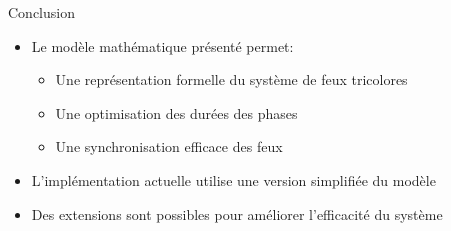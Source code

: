 \documentclass{beamer}
\begin{document}
\begin{frame}{Conclusion}
\begin{itemize}
    \item Le modèle mathématique présenté permet:
    \begin{itemize}
        \item Une représentation formelle du système de feux tricolores
        \item Une optimisation des durées des phases
        \item Une synchronisation efficace des feux
    \end{itemize}
    \item L'implémentation actuelle utilise une version simplifiée du modèle
    \item Des extensions sont possibles pour améliorer l'efficacité du système
\end{itemize}
\end{frame}
\end{document}
